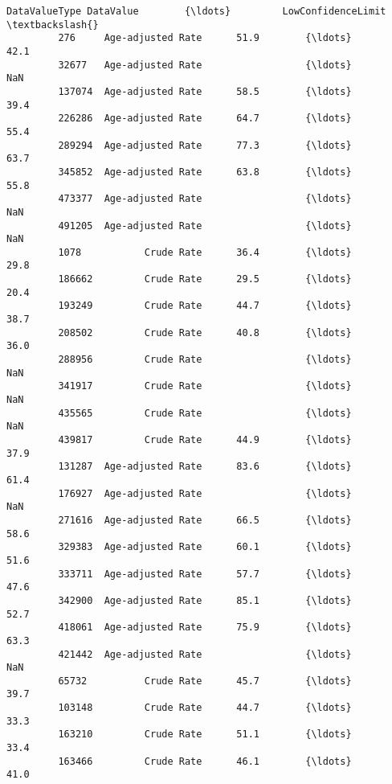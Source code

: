 \documentclass[11pt]{article}
\begin{document}
\begin{Verbatim}[commandchars=\\\{\}]
                     DataValueType DataValue        {\ldots}         LowConfidenceLimit  \textbackslash{}
         276     Age-adjusted Rate      51.9        {\ldots}                       42.1   
         32677   Age-adjusted Rate                  {\ldots}                        NaN   
         137074  Age-adjusted Rate      58.5        {\ldots}                       39.4   
         226286  Age-adjusted Rate      64.7        {\ldots}                       55.4   
         289294  Age-adjusted Rate      77.3        {\ldots}                       63.7   
         345852  Age-adjusted Rate      63.8        {\ldots}                       55.8   
         473377  Age-adjusted Rate                  {\ldots}                        NaN   
         491205  Age-adjusted Rate                  {\ldots}                        NaN   
         1078           Crude Rate      36.4        {\ldots}                       29.8   
         186662         Crude Rate      29.5        {\ldots}                       20.4   
         193249         Crude Rate      44.7        {\ldots}                       38.7   
         208502         Crude Rate      40.8        {\ldots}                       36.0   
         288956         Crude Rate                  {\ldots}                        NaN   
         341917         Crude Rate                  {\ldots}                        NaN   
         435565         Crude Rate                  {\ldots}                        NaN   
         439817         Crude Rate      44.9        {\ldots}                       37.9   
         131287  Age-adjusted Rate      83.6        {\ldots}                       61.4   
         176927  Age-adjusted Rate                  {\ldots}                        NaN   
         271616  Age-adjusted Rate      66.5        {\ldots}                       58.6   
         329383  Age-adjusted Rate      60.1        {\ldots}                       51.6   
         333711  Age-adjusted Rate      57.7        {\ldots}                       47.6   
         342900  Age-adjusted Rate      85.1        {\ldots}                       52.7   
         418061  Age-adjusted Rate      75.9        {\ldots}                       63.3   
         421442  Age-adjusted Rate                  {\ldots}                        NaN   
         65732          Crude Rate      45.7        {\ldots}                       39.7   
         103148         Crude Rate      44.7        {\ldots}                       33.3   
         163210         Crude Rate      51.1        {\ldots}                       33.4   
         163466         Crude Rate      46.1        {\ldots}                       41.0   

\end{Verbatim}
\end{document}
